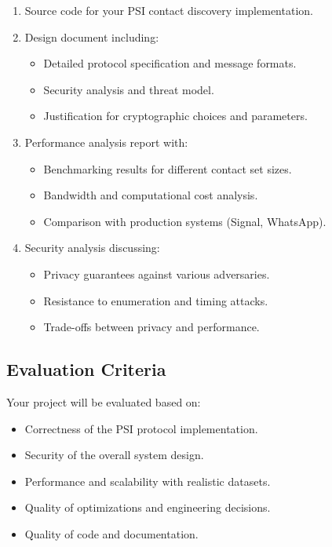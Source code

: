 \documentclass[10pt,a4paper,american]{exam}
\begin{document}
\begin{enumerate}
	\item Source code for your PSI contact discovery implementation.
	\item Design document including:
	      \begin{itemize}
		      \item Detailed protocol specification and message formats.
		      \item Security analysis and threat model.
		      \item Justification for cryptographic choices and parameters.
	      \end{itemize}
	\item Performance analysis report with:
	      \begin{itemize}
		      \item Benchmarking results for different contact set sizes.
		      \item Bandwidth and computational cost analysis.
		      \item Comparison with production systems (Signal, WhatsApp).
	      \end{itemize}
	\item Security analysis discussing:
	      \begin{itemize}
		      \item Privacy guarantees against various adversaries.
		      \item Resistance to enumeration and timing attacks.
		      \item Trade-offs between privacy and performance.
	      \end{itemize}
\end{enumerate}

\subsection*{Evaluation Criteria}
Your project will be evaluated based on:

\begin{itemize}
	\item Correctness of the PSI protocol implementation.
	\item Security of the overall system design.
	\item Performance and scalability with realistic datasets.
	\item Quality of optimizations and engineering decisions.
	\item Quality of code and documentation.
\end{itemize}
\end{document}
